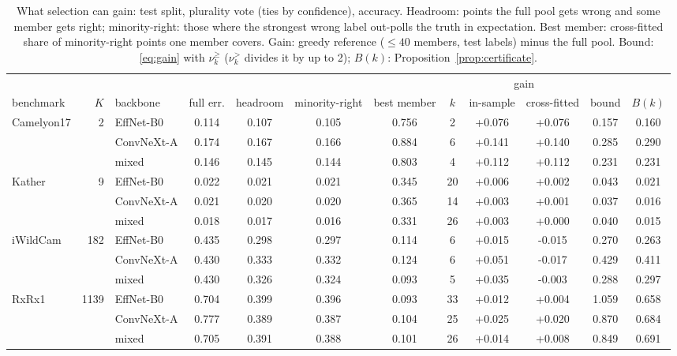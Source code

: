\begin{table}[t]
\centering
\footnotesize
\caption{What selection can gain: test split, plurality vote (ties by confidence), accuracy. Headroom: points the full pool gets wrong and some member gets right; minority-right: those where the strongest wrong label out-polls the truth in expectation. Best member: cross-fitted share of minority-right points one member covers. Gain: greedy reference (${\le}40$ members, test labels) minus the full pool. Bound: \eqref{eq:gain} with $\nu^{\ge}_k$ ($\nu^{>}_k$ divides it by up to 2); $B(k)$: Proposition~\ref{prop:certificate}.}
\label{tab:gain}
\setlength{\tabcolsep}{3pt}\begin{adjustbox}{max width=\linewidth}
\begin{tabular}{lrlccccccccc}
\toprule
& & & & & & & & \multicolumn{2}{c}{gain} & & \\ \cmidrule(lr){9-10} benchmark & $K$ & backbone & full err. & headroom & minority-right & best member & $k$ & in-sample & cross-fitted & bound & $B(k)$ \\
\midrule
Camelyon17 & 2 & EffNet-B0 & 0.114 & 0.107 & 0.105 & 0.756 & 2 & +0.076 & +0.076 & 0.157 & 0.160 \\
 &  & ConvNeXt-A & 0.174 & 0.167 & 0.166 & 0.884 & 6 & +0.141 & +0.140 & 0.285 & 0.290 \\
 &  & mixed & 0.146 & 0.145 & 0.144 & 0.803 & 4 & +0.112 & +0.112 & 0.231 & 0.231 \\
\addlinespace
Kather & 9 & EffNet-B0 & 0.022 & 0.021 & 0.021 & 0.345 & 20 & +0.006 & +0.002 & 0.043 & 0.021 \\
 &  & ConvNeXt-A & 0.021 & 0.020 & 0.020 & 0.365 & 14 & +0.003 & +0.001 & 0.037 & 0.016 \\
 &  & mixed & 0.018 & 0.017 & 0.016 & 0.331 & 26 & +0.003 & +0.000 & 0.040 & 0.015 \\
\addlinespace
iWildCam & 182 & EffNet-B0 & 0.435 & 0.298 & 0.297 & 0.114 & 6 & +0.015 & -0.015 & 0.270 & 0.263 \\
 &  & ConvNeXt-A & 0.430 & 0.333 & 0.332 & 0.124 & 6 & +0.051 & -0.017 & 0.429 & 0.411 \\
 &  & mixed & 0.430 & 0.326 & 0.324 & 0.093 & 5 & +0.035 & -0.003 & 0.288 & 0.297 \\
\addlinespace
RxRx1 & 1139 & EffNet-B0 & 0.704 & 0.399 & 0.396 & 0.093 & 33 & +0.012 & +0.004 & 1.059 & 0.658 \\
 &  & ConvNeXt-A & 0.777 & 0.389 & 0.387 & 0.104 & 25 & +0.025 & +0.020 & 0.870 & 0.684 \\
 &  & mixed & 0.705 & 0.391 & 0.388 & 0.101 & 26 & +0.014 & +0.008 & 0.849 & 0.691 \\
\bottomrule
\end{tabular}
\end{adjustbox}
\end{table}
